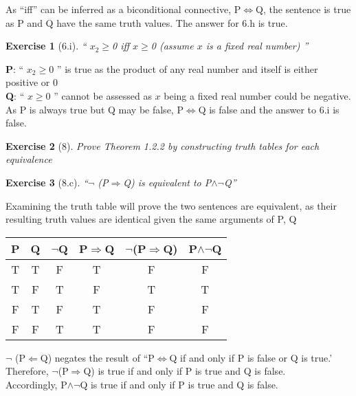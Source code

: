 \documentclass[11pt]{article}
\theoremstyle{quest}
\newtheorem*{exercise}{Exercise}
\begin{document}
As ``iff'' can be inferred as a biconditional connective, P$\Leftrightarrow$Q, 
the sentence is true as P and Q have the same truth values. The answer for 6.h 
is true.

\begin{exercise}[6.i]
  `` $x_2$$\ge$0 iff $x$$\ge$0 (assume $x$ is a fixed real number) '' 
\end{exercise}
\noindent \textbf{P}: `` $x_2$$\ge$0 '' is true as the product of any real number and itself is either positive or 0 \\
\textbf{Q}: `` $x$$\ge$0 '' cannot be assessed as $x$ being a fixed real number could be negative. \\
As P is always true but Q may be false, P$\Leftrightarrow$Q is false and the 
answer to 6.i is false.

\newpage

\begin{exercise}[8]
Prove Theorem 1.2.2 by constructing truth tables for each equivalence
\end{exercise}
\begin{exercise}[8.c]
  ``$\neg$ (P$\Rightarrow$Q) is equivalent to P$\wedge$$\neg$Q''
\end{exercise}

Examining the truth table will prove the two sentences are equivalent, as their 
resulting truth values are identical given the same arguments of P, Q

\begin{table}[ht] 
\centering %
\begin{tabular}{c c c c c c} %
\hline\hline %
P & Q & $\neg$Q & P$\Rightarrow$Q & $\neg$(P$\Rightarrow$Q) & P$\wedge$$\neg$Q \\ [0.5ex] %
\hline %
T & T & F & T & F & F \\ %
T & F & T & F & T & T \\
F & T & F & T & F & F \\
F & F & T & T & F & F \\ [1ex] %
\hline %
\end{tabular} 
\end{table}

$\neg$ (P$\Leftarrow$Q) negates the result of ``P$\Leftrightarrow$Q if and only if P is false or Q is true.' 
Therefore, $\neg$(P$\Rightarrow$Q) is true if and only if P is true and Q is false.\\
Accordingly, P$\wedge$$\neg$Q is true if and only if P is true and Q is false.
\end{document}
